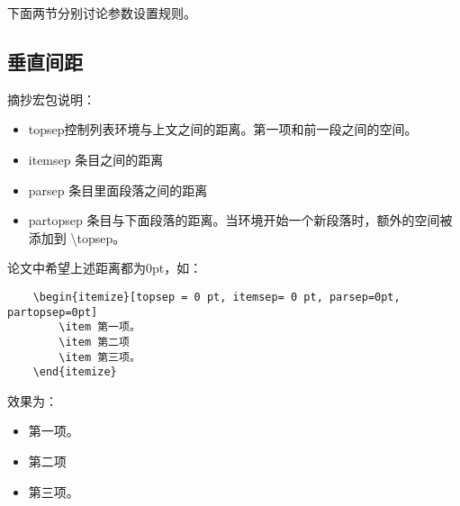 下面两节分别讨论参数设置规则。
\subsection{垂直间距}
摘抄宏包说明：
\begin{itemize}[topsep = 0 pt, itemsep= 0 pt, parsep=0pt, partopsep=0pt, leftmargin=36pt, itemindent=0pt, labelsep=6pt, listparindent=24pt]
	\item topsep控制列表环境与上文之间的距离。第一项和前一段之间的空间。

	\item itemsep 条目之间的距离

	\item parsep 条目里面段落之间的距离
 
	\item partopsep 条目与下面段落的距离。当环境开始一个新段落时，额外的空间被添加到 \textbackslash{}topsep。
\end{itemize}

论文中希望上述距离都为0pt，如：
\begin{lstlisting}
	\begin{itemize}[topsep = 0 pt, itemsep= 0 pt, parsep=0pt, partopsep=0pt]
		\item 第一项。
		\item 第二项
		\item 第三项。
	\end{itemize}
\end{lstlisting}
效果为：
\begin{itemize}[topsep = 0 pt, itemsep= 0 pt, parsep=0pt, partopsep=0pt]
	\item 第一项。
	\item 第二项
	\item 第三项。
\end{itemize}


